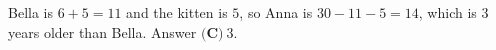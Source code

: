 Bella is $6+5=11$ and the kitten is $5$, so Anna is $30-11-5=14$, which is $3$ years older than Bella. Answer $\boxed{\textbf{(C)}\ 3}$.
